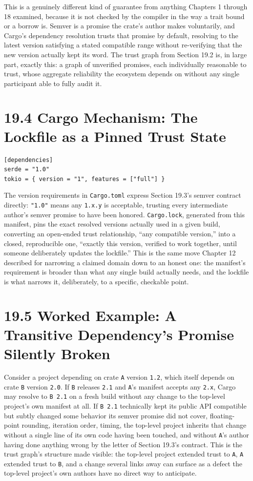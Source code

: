 \documentclass[11pt]{book}
\begin{document}
This is a genuinely different kind of guarantee from anything Chapters 1 through 18 examined, because it is not checked by the compiler in the way a trait bound or a borrow is. Semver is a promise the crate's author makes voluntarily, and Cargo's dependency resolution trusts that promise by default, resolving to the latest version satisfying a stated compatible range without re-verifying that the new version actually kept its word. The trust graph from Section 19.2 is, in large part, exactly this: a graph of unverified promises, each individually reasonable to trust, whose aggregate reliability the ecosystem depends on without any single participant able to fully audit it.

\section*{19.4 Cargo Mechanism: The Lockfile as a Pinned Trust State}

\begin{lstlisting}
[dependencies]
serde = "1.0"
tokio = { version = "1", features = ["full"] }
\end{lstlisting}

The version requirements in \texttt{Cargo.toml} express Section 19.3's semver contract directly: \texttt{"1.0"} means any \texttt{1.x.y} is acceptable, trusting every intermediate author's semver promise to have been honored. \texttt{Cargo.lock}, generated from this manifest, pins the exact resolved versions actually used in a given build, converting an open-ended trust relationship, ``any compatible version,'' into a closed, reproducible one, ``exactly this version, verified to work together, until someone deliberately updates the lockfile.'' This is the same move Chapter 12 described for narrowing a claimed domain down to an honest one: the manifest's requirement is broader than what any single build actually needs, and the lockfile is what narrows it, deliberately, to a specific, checkable point.

\section*{19.5 Worked Example: A Transitive Dependency's Promise Silently Broken}

Consider a project depending on crate \texttt{A} version \texttt{1.2}, which itself depends on crate \texttt{B} version \texttt{2.0}. If \texttt{B} releases \texttt{2.1} and \texttt{A}'s manifest accepts any \texttt{2.x}, Cargo may resolve to \texttt{B 2.1} on a fresh build without any change to the top-level project's own manifest at all. If \texttt{B 2.1} technically kept its public API compatible but subtly changed some behavior its semver promise did not cover, floating-point rounding, iteration order, timing, the top-level project inherits that change without a single line of its own code having been touched, and without \texttt{A}'s author having done anything wrong by the letter of Section 19.3's contract. This is the trust graph's structure made visible: the top-level project extended trust to \texttt{A}, \texttt{A} extended trust to \texttt{B}, and a change several links away can surface as a defect the top-level project's own authors have no direct way to anticipate.
\end{document}
